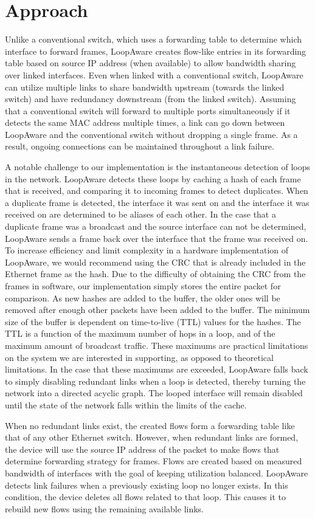 \section{Approach}
\label{sec:approach}
    Unlike a conventional switch, which uses a forwarding table to determine which interface to forward frames, LoopAware creates flow-like entries in its forwarding table based on source IP address (when available) to allow bandwidth sharing over linked interfaces.
    Even when linked with a conventional switch, LoopAware can utilize multiple links to share bandwidth upstream (towards the linked switch) and have redundancy downstream (from the linked switch).
    Assuming that a conventional switch will forward to multiple ports simultaneously if it detects the same MAC address multiple times, a link can go down between LoopAware and the conventional switch without dropping a single frame.
    As a result, ongoing connections can be maintained throughout a link failure.

    A notable challenge to our implementation is the instantaneous detection of loops in the network.
    LoopAware detects these loops by caching a hash of each frame that is received, and comparing it to incoming frames to detect duplicates.
    When a duplicate frame is detected, the interface it was sent on and the interface it was received on are determined to be aliases of each other.
    In the case that a duplicate frame was a broadcast and the source interface can not be determined, LoopAware sends a frame back over the interface that the frame was received on.
    To increase efficiency and limit complexity in a hardware implementation of LoopAware, we would recommend using the CRC that is already included in the Ethernet frame as the hash.
    Due to the difficulty of obtaining the CRC from the frames in software, our implementation simply stores the entire packet for comparison.
    As new hashes are added to the buffer, the older ones will be removed after enough other packets have been added to the buffer.
    The minimum size of the buffer is dependent on time-to-live (TTL) values for the hashes.
    The TTL is a function of the maximum number of hops in a loop, and of the maximum amount of broadcast traffic.
    These maximums are practical limitations on the system we are interested in supporting, as opposed to theoretical limitations.
    In the case that these maximums are exceeded, LoopAware falls back to simply disabling redundant links when a loop is detected, thereby turning the network into a directed acyclic graph.
    The looped interface will remain disabled until the state of the network falls within the limits of the cache.
    
    When no redundant links exist, the created flows form a forwarding table like that of any other Ethernet switch.
    However, when redundant links are formed, the device will use the source IP address of the packet to make flows that determine forwarding strategy for frames.
    Flows are created based on measured bandwidth of interfaces with the goal of keeping utilization balanced.
    LoopAware detects link failures when a previously existing loop no longer exists.
    In this condition, the device deletes all flows related to that loop.
    This causes it to rebuild new flows using the remaining available links.

